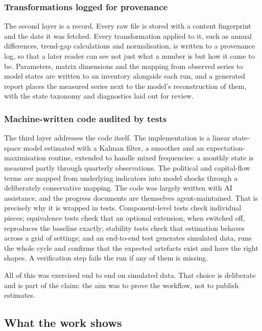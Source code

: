 \documentclass[
  british,
  a4paper,
]{article}
\begin{document}
\subsubsection{Transformations logged for
provenance}\label{transformations-logged-for-provenance}

The second layer is a record. Every raw file is stored with a content
fingerprint and the date it was fetched. Every transformation applied to
it, such as annual differences, trend-gap calculations and
normalisation, is written to a provenance log, so that a later reader
can see not just what a number is but how it came to be. Parameters,
matrix dimensions and the mapping from observed series to model states
are written to an inventory alongside each run, and a generated report
places the measured series next to the model's reconstruction of them,
with the state taxonomy and diagnostics laid out for review.

\subsubsection{Machine-written code audited by
tests}\label{machine-written-code-audited-by-tests}

The third layer addresses the code itself. The implementation is a
linear state-space model estimated with a Kalman filter, a smoother and
an expectation-maximisation routine, extended to handle mixed
frequencies: a monthly state is measured partly through quarterly
observations. The political and capital-flow terms are mapped from
underlying indicators into model shocks through a deliberately
conservative mapping. The code was largely written with AI assistance,
and the progress documents are themselves agent-maintained. That is
precisely why it is wrapped in tests. Component-level tests check
individual pieces; equivalence tests check that an optional extension,
when switched off, reproduces the baseline exactly; stability tests
check that estimation behaves across a grid of settings; and an
end-to-end test generates simulated data, runs the whole cycle and
confirms that the expected artefacts exist and have the right shapes. A
verification step fails the run if any of them is missing.

All of this was exercised end to end on simulated data. That choice is
deliberate and is part of the claim: the aim was to prove the workflow,
not to publish estimates.

\subsection{What the work shows}\label{what-the-work-shows}
\end{document}
